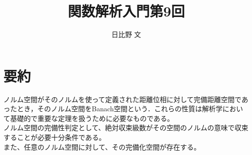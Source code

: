 \documentclass[12pt,a4paper]{ltjsarticle}
\begin{document}
\title{関数解析入門第9回}
\author{日比野 文}
\maketitle

\section{要約}
ノルム空間がそのノルムを使って定義された距離位相に対して完備距離空間であったとき，そのノルム空間をBanach空間という．これらの性質は解析学において基礎的で重要な定理を扱うために必要なものである。\\
ノルム空間の完備性判定として、絶対収束級数がその空間のノルムの意味で収束することが必要十分条件である。\\
また、任意のノルム空間に対して、その完備化空間が存在する。\\
\end{document}
